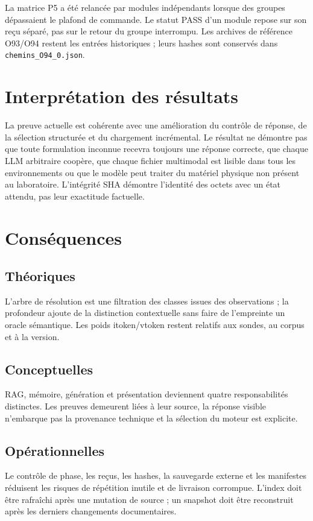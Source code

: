\documentclass[11pt,a4paper]{article}
\begin{document}
La matrice P5 a été relancée par modules indépendants lorsque des groupes dépassaient le plafond de commande. Le statut PASS d'un module repose sur son reçu séparé, pas sur le retour du groupe interrompu. Les archives de référence O93/O94 restent les entrées historiques ; leurs hashes sont conservés dans \texttt{chemins\_O94\_0.json}.

\section{Interprétation des résultats}
La preuve actuelle est cohérente avec une amélioration du contrôle de réponse, de la sélection structurée et du chargement incrémental. Le résultat ne démontre pas que toute formulation inconnue recevra toujours une réponse correcte, que chaque LLM arbitraire coopère, que chaque fichier multimodal est lisible dans tous les environnements ou que le modèle peut traiter du matériel physique non présent au laboratoire. L'intégrité SHA démontre l'identité des octets avec un état attendu, pas leur exactitude factuelle.

\section{Conséquences}
\subsection{Théoriques}
L'arbre de résolution est une filtration des classes issues des observations ; la profondeur ajoute de la distinction contextuelle sans faire de l'empreinte un oracle sémantique. Les poids itoken/vtoken restent relatifs aux sondes, au corpus et à la version.

\subsection{Conceptuelles}
RAG, mémoire, génération et présentation deviennent quatre responsabilités distinctes. Les preuves demeurent liées à leur source, la réponse visible n'embarque pas la provenance technique et la sélection du moteur est explicite.

\subsection{Opérationnelles}
Le contrôle de phase, les reçus, les hashes, la sauvegarde externe et les manifestes réduisent les risques de répétition inutile et de livraison corrompue. L'index doit être rafraîchi après une mutation de source ; un snapshot doit être reconstruit après les derniers changements documentaires.
\end{document}
